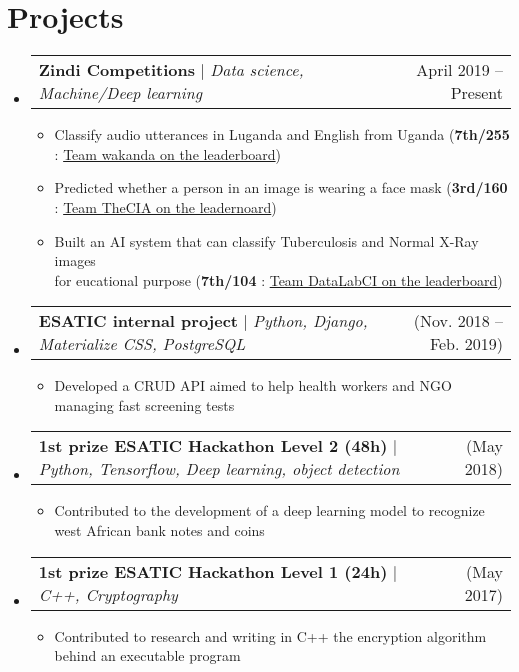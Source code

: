 \documentclass[letterpaper,11pt]{article}
\makeatletter
\newcommand{\resumeItem}[1]{
  \item\small{
    {#1 \vspace{-2pt}}
  }
}
\newcommand{\resumeProjectHeading}[2]{
    \item
    \begin{tabular*}{0.97\textwidth}{l@{\extracolsep{\fill}}r}
      \small#1 & #2 \\
    \end{tabular*}\vspace{-7pt}
}
\newcommand{\resumeSubHeadingListStart}{\begin{itemize}[leftmargin=0.15in, label={}]}
\newcommand{\resumeSubHeadingListEnd}{\end{itemize}}
\newcommand{\resumeItemListStart}{\begin{itemize}}
\newcommand{\resumeItemListEnd}{\end{itemize}\vspace{-5pt}}
\makeatother
\begin{document}
\section{\textbf{Projects}}
    \resumeSubHeadingListStart
    \resumeProjectHeading
        {\textbf{Zindi Competitions} $|$ \emph{Data science, Machine/Deep learning}}{April 2019 -- Present}
        \resumeItemListStart
        \resumeItem{Classify audio utterances in Luganda and English from Uganda (\textbf{7th/255} : \href{https://zindi.africa/competitions/giz-nlp-agricultural-keyword-spotter/leaderboard}{Team wakanda on the leaderboard}) }
        \resumeItem{Predicted whether a person in an image is wearing a face mask (\textbf{3rd/160} : \href{https://zindi.africa/competitions/spot-the-mask-challenge}{Team TheCIA on the leadernoard}) }
        \resumeItem{Built an AI system that can classify Tuberculosis and Normal X-Ray images \\for eucational purpose \hfill(\textbf{7th/104} : \href{https://zindi.africa/competitions/runmila-ai-institute-minohealth-ai-labs-tuberculosis-classification-via-x-rays-challenge/leaderboard}{Team DataLabCI on the leaderboard}) }
    \resumeItemListEnd

    \resumeProjectHeading
        {\textbf{ESATIC internal project} $|$ \emph{Python, Django, Materialize CSS, PostgreSQL}}{(Nov. 2018 -- Feb. 2019)}
        \resumeItemListStart
        \resumeItem{Developed a CRUD API aimed to help health workers and NGO managing fast screening tests}
    \resumeItemListEnd


      \resumeProjectHeading
          {\textbf{1st prize ESATIC Hackathon Level 2 (48h)} $|$ \emph{Python, Tensorflow, Deep learning, object detection}}{(May 2018)}
          \resumeItemListStart
            \resumeItem{Contributed to the development of a deep learning model to recognize west African bank notes and coins}
          \resumeItemListEnd

      \resumeProjectHeading
          {\textbf{1st prize ESATIC Hackathon Level 1 (24h)} $|$ \emph{C++, Cryptography}}{(May 2017)}
          \resumeItemListStart
            \resumeItem{Contributed to research and writing in C++ the encryption algorithm behind an executable program}
          \resumeItemListEnd
    \resumeSubHeadingListEnd



%
\end{document}
